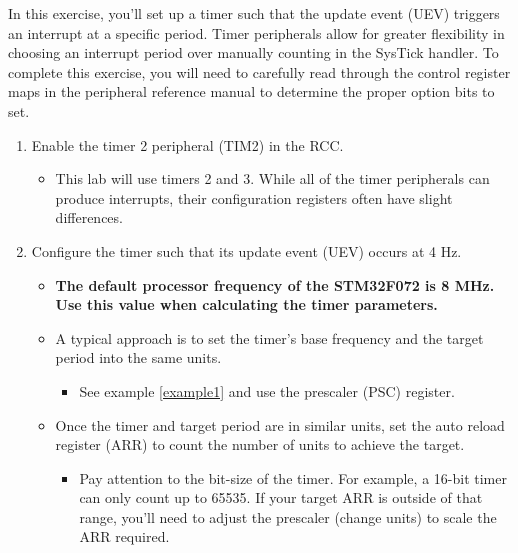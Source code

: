 \documentclass[openany,11pt,fleqn]{book} %
\begin{document}
    \begin{exercise}
        \label{ex1}
        
        In this exercise, you'll set up a timer such that the update event (UEV) triggers an interrupt at a specific period. Timer peripherals allow for greater flexibility in choosing an interrupt period over manually counting in the SysTick handler. To complete this exercise, you will need to carefully read through the control register maps in the peripheral reference manual to determine the proper option bits to set. 
        
        \begin{enumerate}
            \item Enable the timer 2 peripheral (TIM2) in the RCC.
            \begin{itemize}
                \item This lab will use timers 2 and 3. While all of the timer peripherals can produce interrupts, their configuration registers often have slight differences. 
            \end{itemize}
            \item Configure the timer such that its update event (UEV) occurs at 4 Hz.
            \begin{itemize}
                \item \textbf{The default processor frequency of the STM32F072 is 8 MHz. Use this value when calculating the timer parameters.}
                \item A typical approach is to set the timer's base frequency and the target period into the same units. 
                \begin{itemize}
                    \item See example \ref{example1} and use the prescaler (PSC) register. 
                \end{itemize}
                \item Once the timer and target period are in similar units, set the auto reload register (ARR) to count the number of units to achieve the target. 
                \begin{itemize}
                    \item Pay attention to the bit-size of the timer. For example, a 16-bit timer can only count up to 65535. If your target ARR is outside of that range, you'll need to adjust the prescaler (change units) to scale the ARR required. 
                \end{itemize}

\end{itemize}
\end{enumerate}
\end{exercise}
\end{document}

